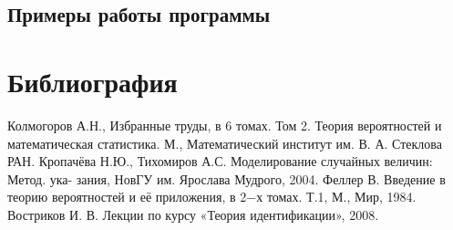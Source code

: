 \documentclass[11pt]{article}
\numberwithin{equation}{section}
\begin{document}
\subsection{Примеры работы программы}








\section{Библиография}

\begin{thebibliography}{1} 
   Колмогоров А.Н., Избранные труды, в 6 томах. Том 2. Теория вероятностей и математическая статистика. М., Математический институт им. В. А. Стеклова РАН.
   Кропачёва Н.Ю., Тихомиров А.С. Моделирование случайных величин: Метод. ука- зания, НовГУ им. Ярослава Мудрого, 2004.
   Феллер В. Введение в теорию вероятностей и её приложения, в 2−х томах. Т.1, М., Мир, 1984.
   Востриков И. В. Лекции по курсу «Теория идентификации», 2008.
\end{thebibliography}
\end{document}
